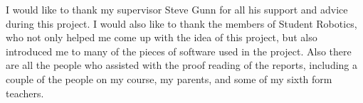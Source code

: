 I would like to thank my supervisor Steve Gunn for all his support and advice
during this project.
I would also like to thank the members of Student Robotics, who not only helped
me come up with the idea of this project, but also introduced me to many of the
pieces of software used in the project.
Also there are all the people who assisted with the proof reading of the
reports, including a couple of the people on my course, my parents, and some of
my sixth form teachers.
